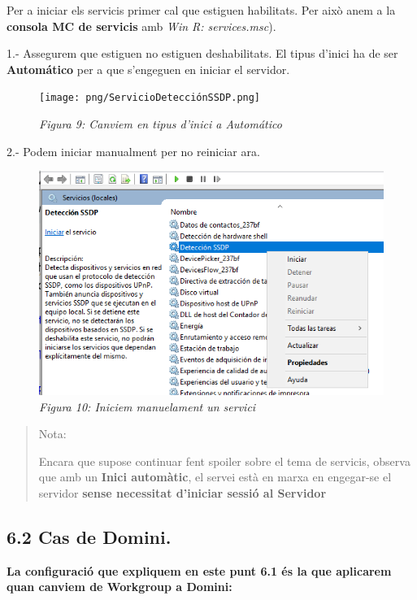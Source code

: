 \documentclass[
  a4paper,
]{article}
\begin{document}
Per a iniciar els servicis primer cal que estiguen habilitats. Per això
anem a la \textbf{consola MC de servicis} amb \emph{Win R:
services.msc}).

1.- Assegurem que estiguen no estiguen deshabilitats. El tipus d'inici
ha de ser \textbf{Automático} per a que s'engeguen en iniciar el
servidor.

\begin{figure}
\centering
\texttt{[image: png/ServicioDetecciónSSDP.png]}
\caption{\emph{Figura 9: Canviem en tipus d'inici a Automático}}
\end{figure}

2.- Podem iniciar manualment per no reiniciar ara.

\begin{figure}
\centering
\includegraphics{png/ServiciInici.png}
\caption{\emph{Figura 10: Iniciem manuelament un servici}}
\end{figure}

\begin{quote}
Nota:

Encara que supose continuar fent spoiler sobre el tema de servicis,
observa que amb un \textbf{Inici automàtic}, el servei està en marxa en
engegar-se el servidor \textbf{sense necessitat d'iniciar sessió al
Servidor}
\end{quote}

\subsection{6.2 Cas de Domini.}\label{cas-de-domini.}

\textbf{La configuració que expliquem en este punt 6.1 és la que
aplicarem quan canviem de Workgroup a Domini:}
\end{document}
